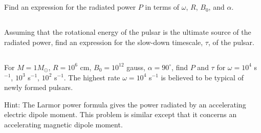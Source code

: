 \documentclass[11pt]{article}
\begin{document}
\vspace{-8pt}
\subsection{}
\vspace{-8pt}
Find an expression for the radiated power $P$ in terms of $\omega$,
$R$, $B_0$, and $\alpha$.

\vspace{-8pt}
\subsection{}
\vspace{-8pt}
Assuming that the rotational energy of the pulsar is the ultimate source
of the radiated power, find an expression for the slow-down timescale,
$\tau$, of the pulsar.

\vspace{-8pt}
\subsection{}
\vspace{-8pt}
For $M=1 M_\odot$, $R=10^6$ cm, $B_0=10^{12}$ gauss, $\alpha=90^\circ$,
find $P$ and $\tau$ for $\omega=10^4$ s$^{-1}$, $10^3$ s$^{-1}$,
$10^2$ s$^{-1}$.  The highest rate $\omega=10^4$ s$^{-1}$ is believed
to be typical of newly formed pulsars.

Hint: The Larmor power formula gives the power radiated by an accelerating
electric dipole moment. This problem is similar except that it concerns an
accelerating magnetic dipole moment.
\end{document}
